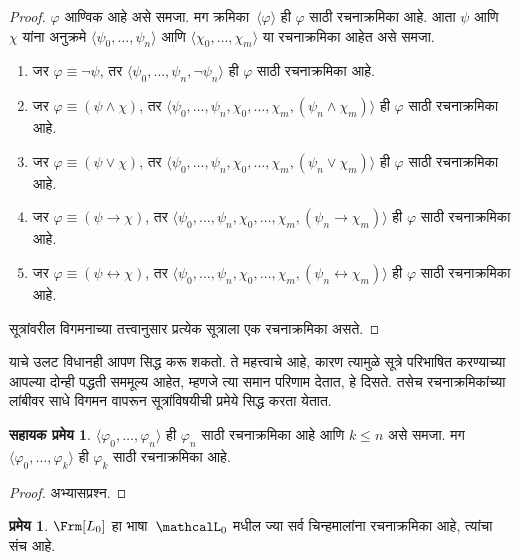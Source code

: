 \documentclass[11pt,a4paper,openany]{book}
\theoremstyle{definition}
\newtheorem{thm}[defn]{प्रमेय}
\newcommand{\tuple}[1]{\langle #1\rangle}
\newcommand{\lif}{\mathbin{\to}}
\newcommand{\liff}{\mathbin{\leftrightarrow}}
\newtheorem{lem}[defn]{सहायक प्रमेय}
\newcommand{\applytofirst}[2]{{\expandafter#1#2}}
\newcommand{\Lang}[1]{\applytofirst{\mathcal}{#1}}
\newcommand{\ident}{\equiv}
\begin{document}
\begin{proof}
$\varphi$ आण्विक आहे असे समजा. मग क्रमिका~$\tuple{\varphi}$ ही $\varphi$ साठी
रचनाक्रमिका आहे.
आता $\psi$ आणि~$\chi$ यांना अनुक्रमे $\tuple{\psi_0,\dotsc,\psi_n}$ आणि
$\tuple{\chi_0,\dotsc,\chi_m}$ या रचनाक्रमिका आहेत असे समजा.
\begin{enumerate}
  \item जर $\varphi \ident \lnot \psi$, तर
      $\tuple{\psi_0,\dotsc,\psi_n,\lnot \psi_n}$ ही $\varphi$ साठी
      रचनाक्रमिका आहे.
  \item जर $\varphi \ident (\psi \land \chi)$, तर
      $\tuple{\psi_0,\dotsc,\psi_n,\chi_0,\dotsc,\chi_m,(\psi_n \land \chi_m)}$
      ही $\varphi$ साठी रचनाक्रमिका आहे.
  \item जर $\varphi \ident (\psi \lor \chi)$, तर
      $\tuple{\psi_0,\dotsc,\psi_n,\chi_0,\dotsc,\chi_m,(\psi_n \lor \chi_m)}$
      ही $\varphi$ साठी रचनाक्रमिका आहे.
  \item जर $\varphi \ident (\psi \lif \chi)$, तर
      $\tuple{\psi_0,\dotsc,\psi_n,\chi_0,\dotsc,\chi_m,(\psi_n \lif \chi_m)}$
      ही $\varphi$ साठी रचनाक्रमिका आहे.
  \item जर $\varphi \ident (\psi \liff \chi)$, तर
      $\tuple{\psi_0,\dotsc,\psi_n,\chi_0,\dotsc,\chi_m,(\psi_n \liff \chi_m)}$
      ही $\varphi$ साठी रचनाक्रमिका आहे.
\end{enumerate}
सूत्रांवरील विगमनाच्या तत्त्वानुसार प्रत्येक सूत्राला एक
रचनाक्रमिका असते.
\end{proof}

याचे उलट विधानही आपण सिद्ध करू शकतो. ते महत्त्वाचे आहे, कारण त्यामुळे
सूत्रे परिभाषित करण्याच्या आपल्या दोन्ही पद्धती सममूल्य आहेत, म्हणजे
त्या समान परिणाम देतात, हे दिसते. तसेच रचनाक्रमिकांच्या लांबीवर साधे
विगमन वापरून सूत्रांविषयीची प्रमेये सिद्ध करता येतात.

\begin{lem}
\label{pl:syn:fseq:lem:fseq-init}
$\tuple{\varphi_0,\dotsc,\varphi_n}$ ही $\varphi_n$ साठी रचनाक्रमिका आहे आणि
$k \leq n$ असे समजा. मग $\tuple{\varphi_0,\dotsc,\varphi_k}$ ही $\varphi_k$ साठी
रचनाक्रमिका आहे.
\end{lem}

\begin{proof}
अभ्यासप्रश्न.
\end{proof}

\begin{thm}
\label{pl:syn:fseq:thm:fseq-frm-equiv}
$\Frm[L_0]$ हा भाषा~$\Lang L_0$ मधील ज्या सर्व चिन्हमालांना
रचनाक्रमिका आहे, त्यांचा संच आहे.
\end{thm}
\end{document}
